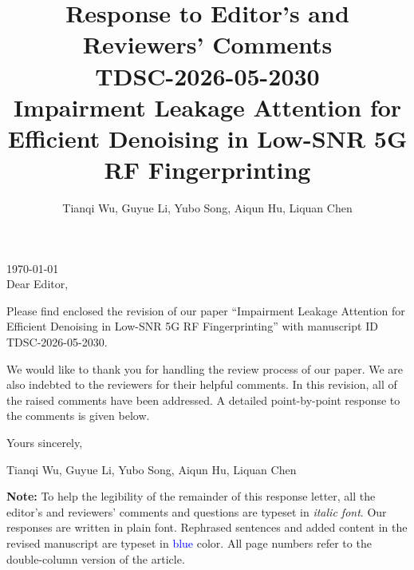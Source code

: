 \documentclass[onecolumn,11pt]{article}
\begin{document}
\title{
    {\bfseries Response to Editor's and Reviewers' Comments\\TDSC-2026-05-2030}\\\vspace*{2cm}
    {\Large Impairment Leakage Attention for Efficient Denoising in Low-SNR 5G RF Fingerprinting}\\\vspace*{2cm}
   \vspace*{1cm} }


 \author{Tianqi Wu, Guyue Li, Yubo Song, Aiqun Hu, Liquan Chen\vspace*{1cm}}


\maketitle\thispagestyle{empty}\newpage
\setlength{\parskip}{2ex plus0.5ex minus0.2ex} %


\thispagestyle{empty} \vspace{-10mm}

\hfill \today\\[2\baselineskip]


\noindent Dear Editor,

\noindent Please find enclosed the revision of our paper ``Impairment Leakage Attention for Efficient Denoising in Low-SNR 5G RF Fingerprinting'' with manuscript ID TDSC-2026-05-2030.

\noindent We would like to thank you for handling the review process of our paper. We are also indebted to the reviewers for their helpful comments. In this revision, all of the raised comments have been addressed. 
A detailed point-by-point response to the comments is given below.

\noindent Yours sincerely,

\noindent Tianqi Wu, Guyue Li, Yubo Song, Aiqun Hu, Liquan Chen\vspace{5mm}

\noindent \textbf{Note:} To help the legibility of the remainder of this response letter, all the editor's and reviewers' comments and questions are typeset in \emph{italic font}. Our responses are written in plain font. Rephrased sentences and added content in the revised manuscript are typeset in \textcolor{blue}{blue} color. All page numbers refer to the double-column version of the article.

\clearpage
\end{document}
